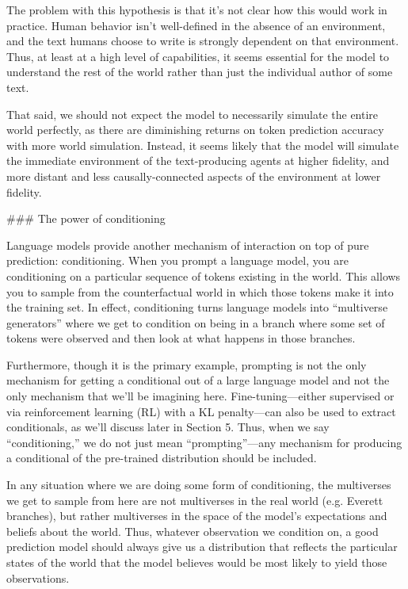{The problem with this hypothesis is that it's not clear how this would work in practice. Human behavior isn't well-defined in the absence of an environment, and the text humans choose to write is strongly dependent on that environment. Thus, at least at a high level of capabilities, it seems essential for the model to understand the rest of the world rather than just the individual author of some text.

That said, we should not expect the model to necessarily simulate the entire world perfectly, as there are diminishing returns on token prediction accuracy with more world simulation. Instead, it seems likely that the model will simulate the immediate environment of the text-producing agents at higher fidelity, and more distant and less causally-connected aspects of the environment at lower fidelity.


### The power of conditioning

Language models provide another mechanism of interaction on top of pure prediction: conditioning. When you prompt a language model, you are conditioning on a particular sequence of tokens existing in the world. This allows you to sample from the counterfactual world in which those tokens make it into the training set. In effect, conditioning turns language models into ``multiverse generators\cite{TODO: cite https://generative.ink/posts/language-models-are-multiverse-generators/}'' where we get to condition on being in a branch where some set of tokens were observed and then look at what happens in those branches.

Furthermore, though it is the primary example, prompting is not the only mechanism for getting a conditional out of a large language model and not the only mechanism that we'll be imagining here. Fine-tuning---either supervised or via reinforcement learning (RL) with a KL penalty\cite{TODO: cite https://www.lesswrong.com/posts/eoHbneGvqDu25Hasc/rl-with-kl-penalties-is-better-seen-as-bayesian-inference}---can also be used to extract conditionals, as we'll discuss later in Section 5\cite{TODO: cite https://www.alignmentforum.org/posts/3ydumADYt9xkaKRTF/conditioning-predictive-models-interactions-with-other}. Thus, when we say ``conditioning,'' we do not just mean ``prompting''---any mechanism for producing a conditional of the pre-trained distribution should be included.

In any situation where we are doing some form of conditioning, the multiverses we get to sample from here are not multiverses in the real world (e.g. Everett branches\cite{TODO: cite https://www.lesswrong.com/posts/2D9s6kpegDQtrueBE/multiple-worlds-one-universal-wave-function}), but rather multiverses in the space of the model's expectations and beliefs about the world. Thus, whatever observation we condition on, a good prediction model should always give us a distribution that reflects the particular states of the world that the model believes would be most likely to yield those observations.

}
